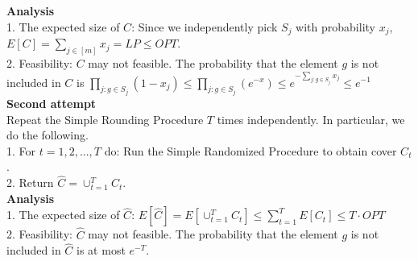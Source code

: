 \noindent\textbf{Analysis}\\
1. The expected size of $C$: Since we independently pick $S_j$ with probability $x_j$, $E[C]=\sum_{j \in [m]}x_j=LP\le OPT$.\\
2. Feasibility: $C$ may not feasible. The probability that the element $g$ is not included in $C$ is $\prod_{j:g\in S_j}(1-x_j)\le \prod_{j:g\in S_j}(e^{-x}) \le e^{-\sum_{j:g\in S_j}x_j} \le e^{-1}$\\
\noindent\textbf{Second attempt}\\
Repeat the Simple Rounding Procedure $T$ times independently. In particular, we do the following.\\
1. For $t=1,2,...,T$ do:
Run the Simple Randomized Procedure to obtain cover $C_t$.\\
2. Return $\widehat{C}=\cup_{t=1}^TC_t$.\\
\noindent\textbf{Analysis}\\
1. The expected size of $\widehat{C}$: $E[\widehat{C}]= E[\cup_{t=1}^TC_t]\le \sum_{t=1}^{T}E[C_t]\le T\cdot OPT$\\
2. Feasibility: $\widehat{C}$ may not feasible. The probability that the element $g$ is not included in $\widehat{C}$ is at most $e^{-T}$.
